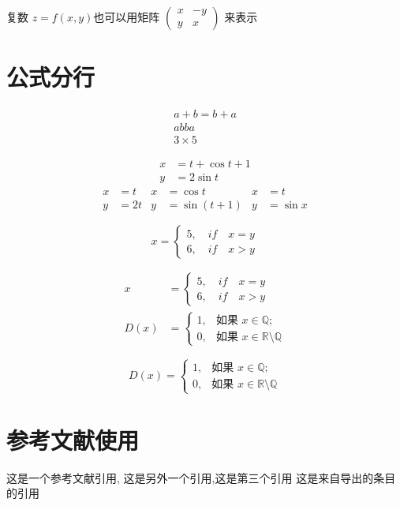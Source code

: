 \documentclass{ctexart}
\begin{document}
复数 $z = f(x,y)$也可以用矩阵
\begin{math}
\left(
\begin{smallmatrix}
x & -y \\ y & x
\end{smallmatrix}
\right)	
\end{math}
来表示

\section{公式分行}
\begin{gather}
	a+b = b+a\\
	ab ba\\
	3 \times 5
\end{gather}

\begin{align}
	x &= t+ \cos t +1 \\
	y &= 2\sin t
\end{align}
\begin{align*}
x &= t& x &= \cos t &x &= t \\
y &= 2t & y &=\sin(t+1) &y &=\sin x
\end{align*}

\[x = \left\{ \begin{array}{l}
5,\quad if \quad x = y\\
6,\quad if\quad x > y
\end{array} \right.\]

\begin{align}
x &= \left\{ \begin{array}{l}
5,\quad if \quad x = y\\
6,\quad if\quad x > y
\end{array} \right. \\
D(x) &= \begin{cases}
1,& \text{如果 }x \in \mathbb{Q};\\
0,& \text{如果 }x \in \mathbb{R}\setminus\mathbb{Q}
\end{cases}
\end{align}

\begin{equation}
	D(x) = \begin{cases}
	1,& \text{如果 }x \in \mathbb{Q};\\
	0,& \text{如果 }x \in \mathbb{R}\setminus\mathbb{Q}
	\end{cases}
\end{equation}
\section{参考文献使用}
这是一个参考文献引用\cite{dosovitskiy2020an}, 这是另外一个引用\cite{junnan2020prototypical},这是第三个引用\cite{liu_representation_2020}
这是来自导出的条目的引用\cite{choromanski2020rethinking}
\cite{chollet2015keras}
\nocite{*}%

\end{document}
